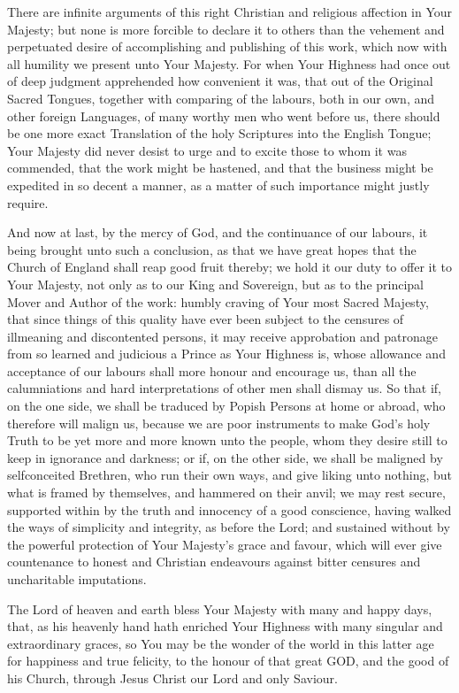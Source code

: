 There are infinite arguments of this right Christian and religious affection in Your Majesty; but none is more forcible to declare it to others than the vehement and perpetuated desire of accomplishing and publishing of this work, which now with all humility we present unto Your Majesty. For when Your Highness had once out of deep judgment apprehended how convenient it was, that out of the Original Sacred Tongues, together with comparing of the labours, both in our own, and other foreign Languages, of many worthy men who went before us, there should be one more exact Translation of the holy Scriptures into the English Tongue; Your Majesty did never desist to urge and to excite those to whom it was commended, that the work might be hastened, and that the business might be expedited in so decent a manner, as a matter of such importance might justly require.

And now at last, by the mercy of God, and the continuance of our labours, it being brought unto such a conclusion, as that we have great hopes that the Church of England shall reap good fruit thereby; we hold it our duty to offer it to Your Majesty, not only as to our King and Sovereign, but as to the principal Mover and Author of the work: humbly craving of Your most Sacred Majesty, that since things of this quality have ever been subject to the censures of illmeaning and discontented persons, it may receive approbation and patronage from so learned and judicious a Prince as Your Highness is, whose allowance and acceptance of our labours shall more honour and encourage us, than all the calumniations and hard interpretations of other men shall dismay us. So that if, on the one side, we shall be traduced by Popish Persons at home or abroad, who therefore will malign us, because we are poor instruments to make God's holy Truth to be yet more and more known unto the people, whom they desire still to keep in ignorance and darkness; or if, on the other side, we shall be maligned by selfconceited Brethren, who run their own ways, and give liking unto nothing, but what is framed by themselves, and hammered on their anvil; we may rest secure, supported within by the truth and innocency of a good conscience, having walked the ways of simplicity and integrity, as before the Lord; and sustained without by the powerful protection of Your Majesty's grace and favour, which will ever give countenance to honest and Christian endeavours against bitter censures and uncharitable imputations.

The Lord of heaven and earth bless Your Majesty with many and happy days, that, as his heavenly hand hath enriched Your Highness with many singular and extraordinary graces, so You may be the wonder of the world in this latter age for happiness and true felicity, to the honour of that great GOD, and the good of his Church, through Jesus Christ our Lord and only Saviour.